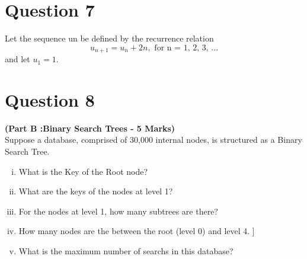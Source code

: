 \documentclass[]{report}
\begin{document}
{{{{{{\begin{itemize}
\end{itemize}


\section*{Question 7}
Let the sequence un be defined by the recurrence relation
\[u_{n+1} = u_n + 2n, \mbox{ for n = 1, 2, 3, ...}\]
and let $u_1 = 1$.\\

\newpage
\section*{Question 8}



\noindent \textbf{(Part B :Binary Search Trees -  5 Marks) }\\
Suppose a database, comprised of 30,000 internal nodes, is structured as a Binary Search Tree.

\begin{enumerate}[(i)]
\item What is the Key of the Root node?
\item What are the keys of the nodes at level 1?
\item For the nodes at level 1, how many subtrees are there?
\item How many nodes are the between the root (level 0) and level 4. ]
\item What is the maximum number of searchs in this database?
\end{enumerate}

}}}}}}
\end{document}
